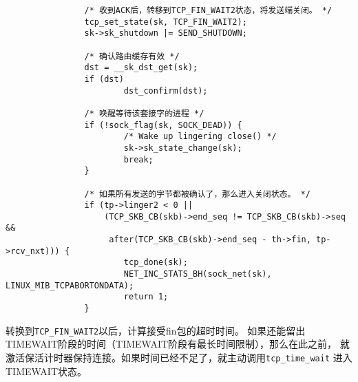 \begin{verbatim}
		        /* 收到ACK后，转移到TCP_FIN_WAIT2状态，将发送端关闭。 */
		        tcp_set_state(sk, TCP_FIN_WAIT2);
		        sk->sk_shutdown |= SEND_SHUTDOWN;

		        /* 确认路由缓存有效 */
		        dst = __sk_dst_get(sk);
		        if (dst)
		                dst_confirm(dst);

		        /* 唤醒等待该套接字的进程 */
		        if (!sock_flag(sk, SOCK_DEAD)) {
		                /* Wake up lingering close() */
		                sk->sk_state_change(sk);
		                break;
		        }

		        /* 如果所有发送的字节都被确认了，那么进入关闭状态。 */
		        if (tp->linger2 < 0 ||
		            (TCP_SKB_CB(skb)->end_seq != TCP_SKB_CB(skb)->seq &&
		             after(TCP_SKB_CB(skb)->end_seq - th->fin, tp->rcv_nxt))) {
		                tcp_done(sk);
		                NET_INC_STATS_BH(sock_net(sk), LINUX_MIB_TCPABORTONDATA);
		                return 1;
		        }
\end{verbatim}
转换到\texttt{TCP_FIN_WAIT2}以后，计算接受fin包的超时时间。
如果还能留出TIMEWAIT阶段的时间（TIMEWAIT阶段有最长时间限制），那么在此之前，
就激活保活计时器保持连接。如果时间已经不足了，就主动调用\texttt{tcp_time_wait}
进入TIMEWAIT状态。
